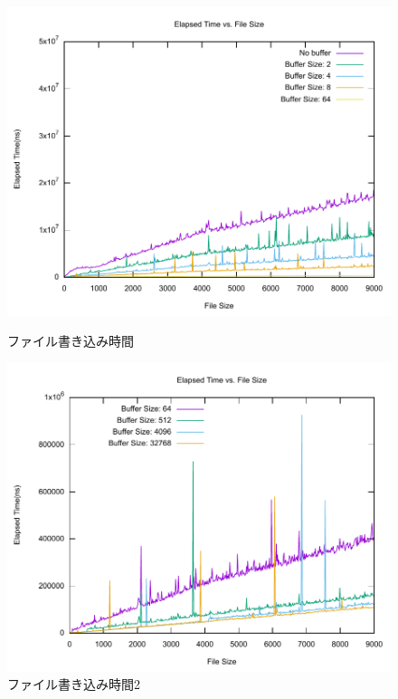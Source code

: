 \documentclass[a4paper, 11pt, titlepage]{jsarticle}
\begin{document}
\begin{figure}[htbp]
  \begin{minipage}[b]{0.45\linewidth}
    \centering
    \includegraphics[keepaspectratio, scale=0.5]{../img/outputTime.pdf}
    \caption{ファイル書き込み時間}
    \label{filewrite1}
  \end{minipage}
  \hspace{0.09\linewidth}
  \begin{minipage}[b]{0.45\linewidth}
    \centering
    \includegraphics[keepaspectratio, scale=0.5]{../img/outputTime2.pdf}
    \caption{ファイル書き込み時間2}
    \label{filewrite2}
  \end{minipage}
\end{figure}
\end{document}
